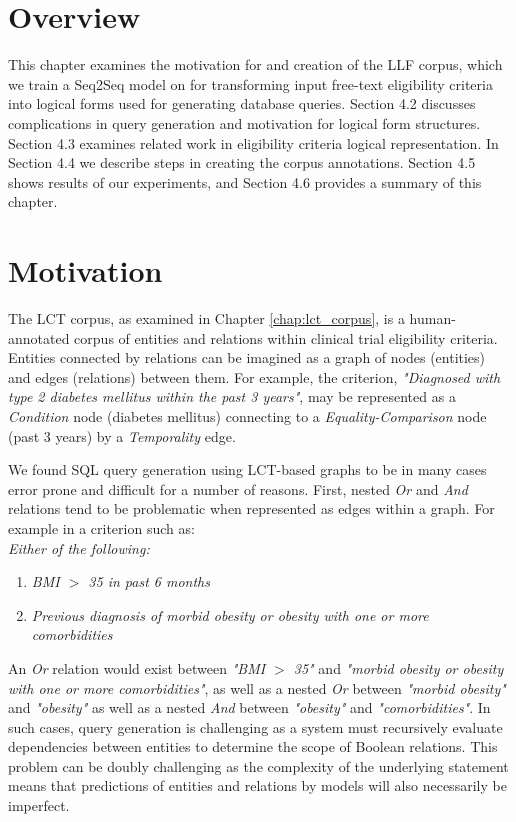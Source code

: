 \documentclass[../main.tex]{subfiles}
\begin{document}
\section{Overview}

This chapter examines the motivation for and creation of the LLF corpus, which we train a Seq2Seq model on for transforming input free-text eligibility criteria into logical forms used for generating database queries. Section 4.2 discusses complications in query generation and motivation for logical form structures. Section 4.3 examines related work in eligibility criteria logical representation. In Section 4.4 we describe steps in creating the corpus annotations. Section 4.5 shows results of our experiments, and Section 4.6 provides a summary of this chapter.

\section{Motivation}

The LCT corpus, as examined in Chapter \ref{chap:lct_corpus}, is a human-annotated corpus of entities and relations within clinical trial eligibility criteria. Entities connected by relations can be imagined as a graph of nodes (entities) and edges (relations) between them. For example, the criterion, \textit{"Diagnosed with type 2 diabetes mellitus within the past 3 years"}, may be represented as a \textit{Condition} node (diabetes mellitus) connecting to a \textit{Equality-Comparison} node (past 3 years) by a \textit{Temporality} edge.

We found SQL query generation using LCT-based graphs to be in many cases error prone and difficult for a number of reasons. First, nested \textit{Or} and \textit{And} relations tend to be problematic when represented as edges within a graph. For example in a criterion such as: \\

\textit{Either of the following:}
\begin{enumerate}
    \itemsep0em 
    \item \textit{BMI $>$ 35 in past 6 months}
    \item \textit{Previous diagnosis of morbid obesity or obesity with one or more comorbidities}
\end{enumerate}

\noindent An \textit{Or} relation would exist between \textit{"BMI $>$ 35"} and \textit{"morbid obesity or obesity with one or more comorbidities"}, as well as a nested \textit{Or} between \textit{"morbid obesity"} and \textit{"obesity"} as well as a nested \textit{And} between \textit{"obesity"} and \textit{"comorbidities"}. In such cases, query generation is challenging as a system must recursively evaluate dependencies between entities to determine the scope of Boolean relations. This problem can be doubly challenging as the complexity of the underlying statement means that predictions of entities and relations by models will also necessarily be imperfect.
\end{document}
